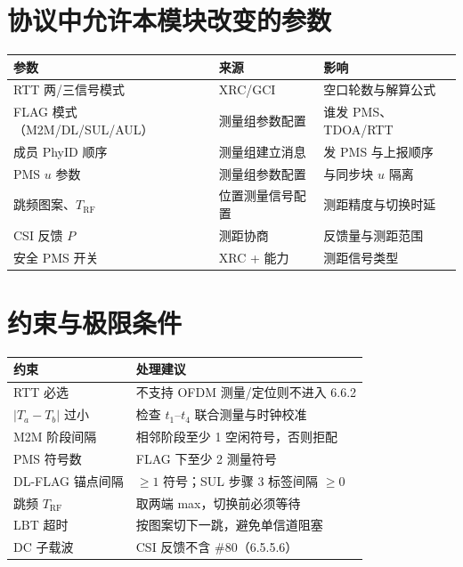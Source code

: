 \documentclass[11pt,a4paper]{ctexart}
\begin{document}
\section{协议中允许本模块改变的参数}

\begin{table}[h]
\centering
\small
\begin{tabular}{lll}
\toprule
\textbf{参数} & \textbf{来源} & \textbf{影响} \\
\midrule
RTT 两/三信号模式 & XRC/GCI & 空口轮数与解算公式 \\
FLAG 模式（M2M/DL/SUL/AUL） & 测量组参数配置 & 谁发 PMS、TDOA/RTT \\
成员 PhyID 顺序 & 测量组建立消息 & 发 PMS 与上报顺序 \\
PMS $u$ 参数 & 测量组参数配置 & 与同步块 $u$ 隔离 \\
跳频图案、$T_{\mathrm{RF}}$ & 位置测量信号配置 & 测距精度与切换时延 \\
CSI 反馈 $P$ & 测距协商 & 反馈量与测距范围 \\
安全 PMS 开关 & XRC + 能力 & 测距信号类型 \\
\bottomrule
\end{tabular}
\end{table}

\section{约束与极限条件}

\begin{table}[h]
\centering
\small
\begin{tabular}{p{4.5cm}p{9.5cm}}
\toprule
\textbf{约束} & \textbf{处理建议} \\
\midrule
RTT 必选 & 不支持 OFDM 测量/定位则不进入 6.6.2 \\
$|T_a-T_b|$ 过小 & 检查 $t_1$--$t_4$ 联合测量与时钟校准 \\
M2M 阶段间隔 & 相邻阶段至少 1 空闲符号，否则拒配 \\
PMS 符号数 & FLAG 下至少 2 测量符号 \\
DL-FLAG 锚点间隔 & $\ge 1$ 符号；SUL 步骤 3 标签间隔 $\ge 0$ \\
跳频 $T_{\mathrm{RF}}$ & 取两端 max，切换前必须等待 \\
LBT 超时 & 按图案切下一跳，避免单信道阻塞 \\
DC 子载波 & CSI 反馈不含 \#80（6.5.5.6） \\
\bottomrule
\end{tabular}
\end{table}
\end{document}
